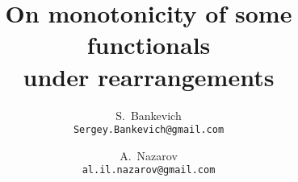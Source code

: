 \documentclass[12pt,russian]{article}
\begin{document}
\title{On monotonicity of some functionals \\ under rearrangements}
\author{
S.~Bankevich\\
\texttt{Sergey.Bankevich@gmail.com}
\and
A.~Nazarov\\
\texttt{al.il.nazarov@gmail.com}
}

\maketitle




















\end{document}

